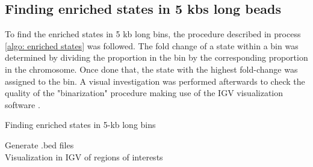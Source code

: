 \subsection{Finding enriched states in 5 kbs long beads}

To find the enriched states in 5 kb long bins, the procedure described in process \ref{algo: enriched states} was followed. The fold change of a state within a bin was determined by dividing the proportion in the bin by the corresponding proportion in the chromosome. Once done that, the state with the highest fold-change was assigned to the bin. A visual investigation was performed afterwards to check the quality of the "binarization" procedure making use of the IGV visualization software
\cite{robinsonIgvJsEmbeddable2020}.

\begin{algorithm}
    \caption{Finding enriched states in 5-kb long bins}\label{algo: enriched states}
    Generate .bed files\\
    Visualization in IGV of regions of interests\\
\end{algorithm}

